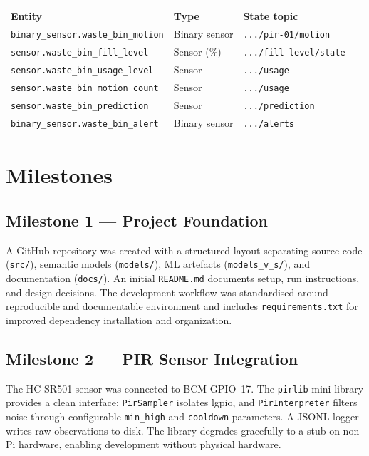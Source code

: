 \documentclass[10pt,a4paper]{article}
\begin{document}
\begin{center}
\begin{tabular}{@{}lll@{}}
\toprule
\textbf{Entity} & \textbf{Type} & \textbf{State topic} \\
\midrule
\texttt{binary\_sensor.waste\_bin\_motion}  & Binary sensor & \texttt{.../pir-01/motion} \\
\texttt{sensor.waste\_bin\_fill\_level}     & Sensor (\%)   & \texttt{.../fill-level/state} \\
\texttt{sensor.waste\_bin\_usage\_level}    & Sensor        & \texttt{.../usage} \\
\texttt{sensor.waste\_bin\_motion\_count}   & Sensor        & \texttt{.../usage} \\
\texttt{sensor.waste\_bin\_prediction}      & Sensor        & \texttt{.../prediction} \\
\texttt{binary\_sensor.waste\_bin\_alert}   & Binary sensor & \texttt{.../alerts} \\
\bottomrule
\end{tabular}
\end{center}

\section{Milestones}

\subsection{Milestone 1 --- Project Foundation}

A GitHub repository was created with a structured layout separating source code
(\texttt{src/}), semantic models (\texttt{models/}), ML artefacts (\texttt{models\_v\_s/}),
and documentation (\texttt{docs/}). An initial \texttt{README.md} documents setup,
run instructions, and design decisions. The development workflow was standardised
around reproducible and documentable environment and includes \texttt{requirements.txt} for improved dependency installation and organization.

\subsection{Milestone 2 --- PIR Sensor Integration}

The HC-SR501 sensor was connected to BCM GPIO~17. The \texttt{pirlib} mini-library
provides a clean interface: \texttt{PirSampler} isolates lgpio, and
\texttt{PirInterpreter} filters noise through configurable \texttt{min\_high} and
\texttt{cooldown} parameters. A JSONL logger writes raw observations to disk.
The library degrades gracefully to a stub on non-Pi hardware, enabling development
without physical hardware.
\end{document}
